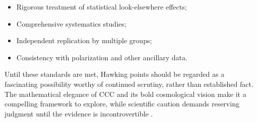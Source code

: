 \documentclass[11pt,a4paper]{article}
\theoremstyle{plain}
\theoremstyle{definition}
\theoremstyle{remark}
\begin{document}
\begin{itemize}
    \item Rigorous treatment of statistical look-elsewhere effects;
    \item Comprehensive systematics studies;
    \item Independent replication by multiple groups;
    \item Consistency with polarization and other ancillary data.
\end{itemize}

Until these standards are met, Hawking points should be regarded as a fascinating possibility worthy of continued scrutiny, rather than established fact. The mathematical elegance of CCC and its bold cosmological vision make it a compelling framework to explore, while scientific caution demands reserving judgment until the evidence is incontrovertible \cite{ccc_wiki,hawking_points_2020}.

\newpage
\printbibliography[title={References}]
\end{document}
